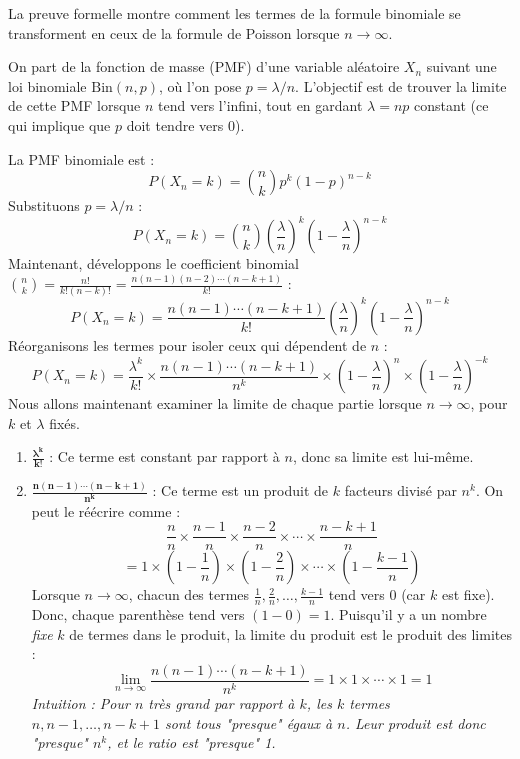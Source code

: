 La preuve formelle montre comment les termes de la formule binomiale se transforment en ceux de la formule de Poisson lorsque $n \to \infty$.

\begin{proofbox}
On part de la fonction de masse (PMF) d'une variable aléatoire $X_n$ suivant une loi binomiale $\text{Bin}(n, p)$, où l'on pose $p = \lambda/n$. L'objectif est de trouver la limite de cette PMF lorsque $n$ tend vers l'infini, tout en gardant $\lambda = np$ constant (ce qui implique que $p$ doit tendre vers 0).

La PMF binomiale est :
$$ P(X_n=k) = \binom{n}{k} p^k (1-p)^{n-k} $$
Substituons $p = \lambda/n$ :
$$ P(X_n=k) = \binom{n}{k} \left(\frac{\lambda}{n}\right)^k \left(1-\frac{\lambda}{n}\right)^{n-k} $$
Maintenant, développons le coefficient binomial $\binom{n}{k} = \frac{n!}{k!(n-k)!} = \frac{n(n-1)(n-2)\cdots(n-k+1)}{k!}$ :
$$ P(X_n=k) = \frac{n(n-1)\cdots(n-k+1)}{k!} \left(\frac{\lambda}{n}\right)^k \left(1-\frac{\lambda}{n}\right)^{n-k} $$
Réorganisons les termes pour isoler ceux qui dépendent de $n$ :
$$ P(X_n=k) = \frac{\lambda^k}{k!} \times \frac{n(n-1)\cdots(n-k+1)}{n^k} \times \left(1-\frac{\lambda}{n}\right)^n \times \left(1-\frac{\lambda}{n}\right)^{-k} $$
Nous allons maintenant examiner la limite de chaque partie lorsque $n \to \infty$, pour $k$ et $\lambda$ fixés.

\begin{enumerate}
    \item $\mathbf{\frac{\lambda^k}{k!}}$ : Ce terme est constant par rapport à $n$, donc sa limite est lui-même.
    
    \item $\mathbf{\frac{n(n-1)\cdots(n-k+1)}{n^k}}$ : Ce terme est un produit de $k$ facteurs divisé par $n^k$. On peut le réécrire comme :
    $$ \frac{n}{n} \times \frac{n-1}{n} \times \frac{n-2}{n} \times \cdots \times \frac{n-k+1}{n} $$
    $$ = 1 \times \left(1-\frac{1}{n}\right) \times \left(1-\frac{2}{n}\right) \times \cdots \times \left(1-\frac{k-1}{n}\right) $$
    Lorsque $n \to \infty$, chacun des termes $\frac{1}{n}, \frac{2}{n}, \dots, \frac{k-1}{n}$ tend vers 0 (car $k$ est fixe). Donc, chaque parenthèse tend vers $(1-0)=1$. Puisqu'il y a un nombre \textit{fixe} $k$ de termes dans le produit, la limite du produit est le produit des limites :
    $$ \lim_{n \to \infty} \frac{n(n-1)\cdots(n-k+1)}{n^k} = 1 \times 1 \times \cdots \times 1 = 1 $$
    \textit{Intuition : Pour $n$ très grand par rapport à $k$, les $k$ termes $n, n-1, \dots, n-k+1$ sont tous "presque" égaux à $n$. Leur produit est donc "presque" $n^k$, et le ratio est "presque" 1.}


\end{enumerate}
\end{proofbox}
